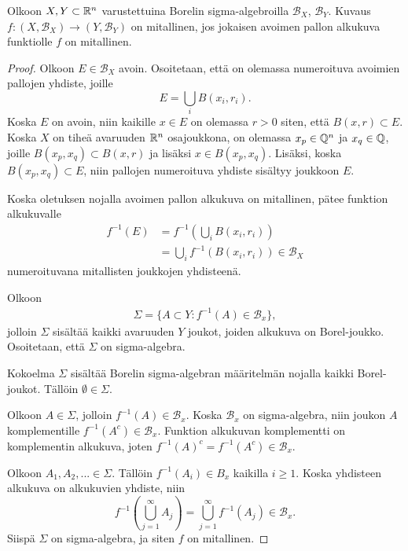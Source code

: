 \documentclass[12pt,oneside,a4paper]{amsbook} %
\begin{document}
\begin{lemma}\label{le:measurableIfBallMeasurable}
    Olkoon $X, Y \subset \mathbb{R}^n$ varustettuina Borelin sigma-algebroilla $\mathcal B_X$, $\mathcal B_Y$. Kuvaus $f: (X, \mathcal B_X) \to (Y, \mathcal B_Y)$ on mitallinen, jos jokaisen avoimen pallon alkukuva funktiolle $f$ on mitallinen.
\end{lemma}
\begin{proof}
    Olkoon $E\in\mathcal B_X$ avoin. Osoitetaan, että on olemassa numeroituva avoimien pallojen yhdiste, joille
    \begin{equation*}
        E = \bigcup_i B(x_i, r_i).
    \end{equation*}
    Koska $E$ on avoin, niin kaikille $x \in E$ on olemassa $r > 0$ siten, että $B(x, r) \subset E$. Koska $X$ on tiheä avaruuden $\mathbb{R}^n$ osajoukkona, on olemassa $x_p \in \mathbb{Q}^n$ ja $x_q \in \mathbb{Q}$, joille $B(x_p, x_q) \subset B(x, r)$ ja lisäksi $x \in B(x_p, x_q)$. Lisäksi, koska $B(x_p, x_q) \subset E$, niin pallojen numeroituva yhdiste sisältyy joukkoon $E$.
    
    Koska oletuksen nojalla avoimen pallon alkukuva on mitallinen, pätee funktion alkukuvalle
    \begin{align*}
        f^{-1}(E) &= f^{-1}\left(\bigcup_i B(x_i, r_i)\right) \\
        &= \bigcup_i f^{-1}(B(x_i, r_i)) \in \mathcal B_X
    \end{align*}
    numeroituvana mitallisten joukkojen yhdisteenä. 
    
    Olkoon 
    \begin{align*}
        \Sigma =\{A \subset Y : f^{-1}(A) \in \mathcal B_x\},
    \end{align*}
    jolloin $\Sigma$ sisältää kaikki avaruuden $Y$ joukot, joiden alkukuva on Borel-joukko. Osoitetaan, että $\Sigma$ on sigma-algebra. 
    
    Kokoelma $\Sigma$ sisältää Borelin sigma-algebran määritelmän nojalla kaikki Borel-joukot. Tällöin $\emptyset \in \Sigma$. 
    
    Olkoon $A \in \Sigma$, jolloin $f^{-1}(A) \in \mathcal B_x$. Koska $\mathcal B_x$ on sigma-algebra, niin joukon $A$ komplementille $f^{-1}(A^c) \in \mathcal B_x$. Funktion alkukuvan komplementti on komplementin alkukuva, joten $f^{-1}(A)^c = f^{-1}(A^c) \in \mathcal{B}_x$.
    
    Olkoon $A_1, A_2, ... \in \Sigma$. Tällöin $f^{-1}(A_i) \in B_x$ kaikilla $i \ge 1$. Koska yhdisteen alkukuva on alkukuvien yhdiste, niin
    \begin{equation*}
        f^{-1}\left(\bigcup_{j=1}^\infty A_j\right) = \bigcup_{j=1}^\infty f^{-1}(A_j) \in \mathcal{B}_x.
    \end{equation*}
    Siispä $\Sigma$ on sigma-algebra, ja siten $f$ on mitallinen.
\end{proof}
\end{document}
